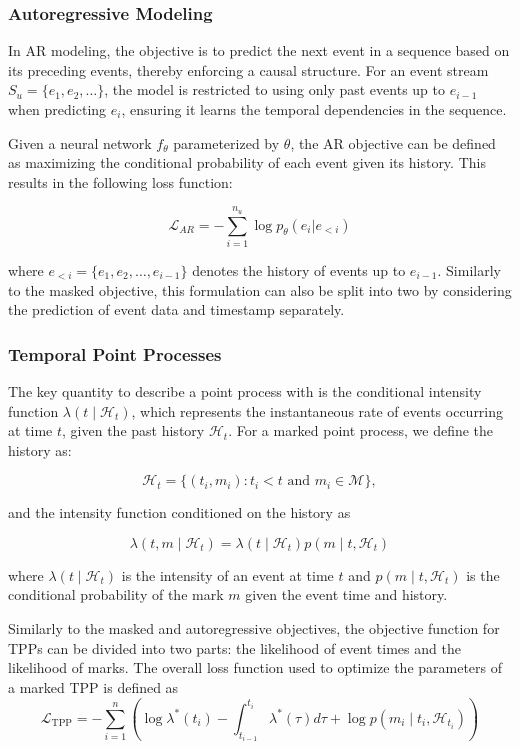 \subsubsection{Autoregressive Modeling}
\label{appendix:autoregressive-modeling}

In AR modeling, the objective is to predict the next event in a sequence based on its preceding events, thereby enforcing a causal structure.
For an event stream $ S_u = \{ e_1, e_2, \dots \} $, the model is restricted to using only past events up to $ e_{i-1} $ when predicting $ e_i $, ensuring it learns the temporal dependencies in the sequence.

Given a neural network $ f_\theta $ parameterized by $\theta$, the AR objective can be defined as maximizing the conditional probability of each event given its history. 
This results in the following loss function:

$$
\mathcal{L}_{AR} = - \sum_{i=1}^{n_u} \log p_\theta(e_i | e_{<i})
$$

where \( e_{<i} = \{ e_1, e_2, \dots, e_{i-1} \} \) denotes the history of events up to \( e_{i-1} \). 
Similarly to the masked objective, this formulation can also be split into two by considering the prediction of event data and timestamp separately.

\subsubsection{Temporal Point Processes}
\label{appendix:tpp-formalism}

The key quantity to describe a point process with is the conditional intensity function $\lambda(t \mid \mathcal{H}_t)$, which represents the instantaneous rate of events occurring at time $t$, given the past history $\mathcal{H}_t$. 
For a marked point process, we define the history as:

$$ \mathcal{H}_t = \{(t_i, m_i) : t_i < t \text{ and } m_i \in \mathcal{M} \}, $$

and the intensity function conditioned on the history as

$$\lambda(t, m \mid \mathcal{H}_t) = \lambda(t \mid \mathcal{H}_t) p(m \mid t, \mathcal{H}_t)$$

where $\lambda(t \mid \mathcal{H}_t)$ is the intensity of an event at time $t$ and $p(m \mid t, \mathcal{H}_t)$ is the conditional probability of the mark $m$ given the event time and history.

Similarly to the masked and autoregressive objectives, the objective function for TPPs can be divided into two parts: the likelihood of event times and the likelihood of marks. 
The overall loss function used to optimize the parameters of a marked TPP is defined as
$$
\mathcal{L}_{\text{TPP}} = - \sum_{i=1}^{n} \left( \log \lambda^*(t_i) - \int_{t_{i-1}}^{t_i} \lambda^*(\tau) d\tau + \log p(m_i \mid t_i, \mathcal{H}_{t_i}) \right)
$$

